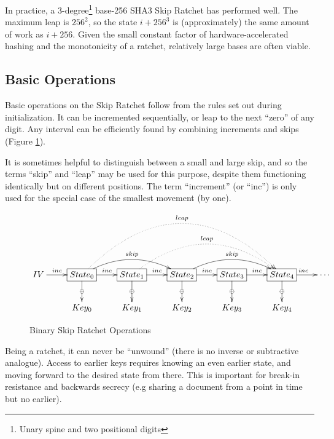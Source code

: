 \documentclass{article}
\begin{document}
	In practice, a 3-degree\footnote{Unary spine and two positional digits} base-256 SHA3 Skip Ratchet has performed well. The maximum leap is $256^{2}$, so the state $i + 256^{3}$ is (approximately) the same amount of work as $i + 256$. Given the small constant factor of hardware-accelerated hashing and the monotonicity of a ratchet, relatively large bases are often viable.

	\subsection{Basic Operations}
	
	Basic operations on the Skip Ratchet follow from the rules set out during initialization. It can be incremented sequentially, or leap to the next ``zero'' of any digit. Any interval can be efficiently found by combining increments and skips (Figure \ref{fig:sr-ops}).
	
	It is sometimes helpful to distinguish between a small and large skip, and so the terms ``skip'' and ``leap'' may be used for this purpose, despite them functioning identically but on different positions. The term ``increment'' (or ``inc'') is only used for the special case of the smallest movement (by one).
	
	\begin{figure}[h]
		\centering
		
		$\xymatrix{
			IV \ar[r]^<<<<<{inc} 
				& *+[F]{State_{0}}
					\ar[d]|\oplus
					\ar[r]^{inc}
					\ar@/^1.5pc/[rr]^{skip}
					\ar@{.>}@/^5pc/[rrrr]^{leap}
				& *+[F]{State_{1}}
					\ar[d]|\oplus
					\ar[r]^{inc}
					\ar@{.>}@/^3pc/[rrr]^{leap}
				& *+[F]{State_{2}} 
					\ar[d]|\oplus
					\ar[r]^{inc}
					\ar@/^1.5pc/[rr]^{skip}
				& *+[F]{State_{3}}
					\ar[d]|\oplus
					\ar[r]^{inc}
				& *+[F]{State_{4}}
					\ar[d]|\oplus
					\ar[r]^{inc}
				& \cdots
			\\
				& Key_{0}
				& Key_{1}
				& Key_{2}
				& Key_{3}
				& Key_{4}
		}$
		
		\caption{Binary Skip Ratchet Operations}
		\label{fig:sr-ops}
	\end{figure}

	Being a ratchet, it can never be ``unwound'' (there is no inverse or subtractive analogue). Access to earlier keys requires knowing an even earlier state, and moving forward to the desired state from there. This is important for break-in resistance and backwards secrecy (e.g sharing a document from a point in time but no earlier).
\end{document}
